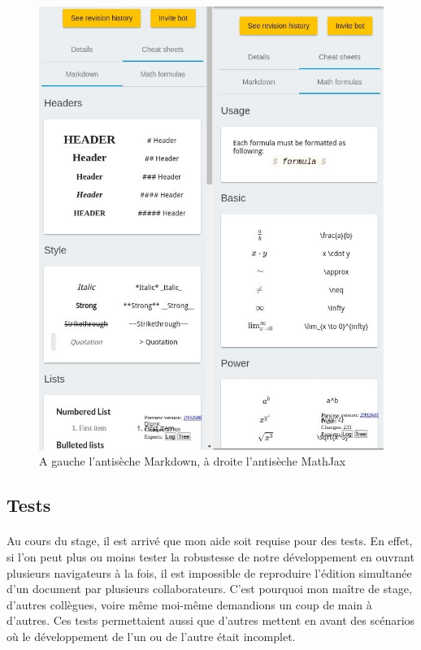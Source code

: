 \documentclass[12pt]{article}
\begin{document}
\begin{figure}[H]
    \centering
    \includegraphics[scale=0.7]{gallery/cheat-sheets.jpg}
    \caption[nom dans le sommaire]{A gauche l'antisèche Markdown, à droite l'antisèche MathJax}
    \label{fig:gallery9}
\end{figure}


\newpage
\subsection{Tests}
\paragraph{}
Au cours du stage, il est arrivé que mon aide soit requise pour des tests. En effet, si l'on peut plus ou moins tester la robustesse de notre développement en ouvrant plusieurs navigateurs à la fois, il est impossible de reproduire l'édition simultanée d'un document par plusieurs collaborateurs. C'est pourquoi mon maître de stage, d'autres collègues, voire même moi-même demandions un coup de main à d'autres. Ces tests permettaient aussi que d'autres mettent en avant des scénarios où le développement de l'un ou de l'autre était incomplet.
\end{document}

